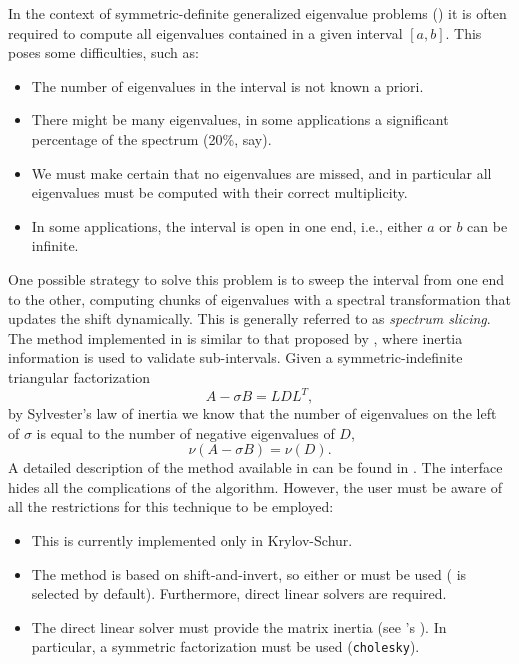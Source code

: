 In the context of symmetric-definite generalized eigenvalue problems () it is often required to compute all eigenvalues contained in a given interval $[a,b]$. This poses some difficulties, such as:
\begin{itemize}
\setlength{\itemsep}{0pt}
\item The number of eigenvalues in the interval is not known a priori.
\item There might be many eigenvalues, in some applications a significant percentage of the spectrum (20\%, say).
\item We must make certain that no eigenvalues are missed, and in particular all eigenvalues must be computed with their correct multiplicity.
\item In some applications, the interval is open in one end, i.e., either $a$ or $b$ can be infinite.
\end{itemize}
One possible strategy to solve this problem is to sweep the interval from one end to the other, computing chunks of eigenvalues with a spectral transformation that updates the shift dynamically. This is generally referred to as \emph{spectrum slicing}. The method implemented in \slepc is similar to that proposed by \cite{Grimes:1994:SBL}, where inertia information is used to validate sub-intervals. Given a symmetric-indefinite triangular factorization
\begin{equation}
A-\sigma B=LDL^T,
\end{equation}
by Sylvester's law of inertia we know that the number of eigenvalues on the left of $\sigma$ is equal to the number of negative eigenvalues of $D$,
\begin{equation}
\nu(A-\sigma B)=\nu(D).
\end{equation}
A detailed description of the method available in \slepc can be found in \citep{Campos:2012:SSS}.
The \slepc interface hides all the complications of the algorithm. However, the user must be aware of all the restrictions for this technique to be employed:
\begin{itemize}
\setlength{\itemsep}{0pt}
\item This is currently implemented only in Krylov-Schur.
\item The method is based on shift-and-invert, so either  or  must be used ( is selected by default). Furthermore, direct linear solvers are required.
\item The direct linear solver must provide the matrix inertia (see \petsc's ). In particular, a symmetric factorization must be used (\texttt{cholesky}).
\end{itemize}

